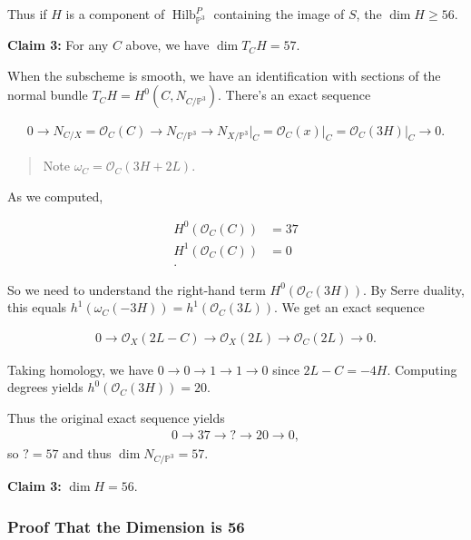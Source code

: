 Thus if \(H\) is a component of
\(\operatorname{Hilb}_{{\mathbb{P}}^3}^P\) containing the image of
\(S\), the \(\dim H \geq 56\).

\textbf{Claim 3:} For any \(C\) above, we have \(\dim T_C H = 57\).

When the subscheme is smooth, we have an identification with sections of
the normal bundle \(T_C H = H^0(C, N_{C/{\mathbb{P}}^3})\). There's an
exact sequence

\begin{align*} 0 \to N_{C/X} = {\mathcal{O}}_C(C) \to N_{C/{\mathbb{P}}^3} \to N_{X/{\mathbb{P}}^3}\mathrel{\Big|}_C = {\mathcal{O}}_C(x)\mathrel{\Big|}_C = {\mathcal{O}}_C(3H)\mathrel{\Big|}_C \to 0 .\end{align*}

\begin{quote}
Note \(\omega_C = {\mathcal{O}}_C(3H + 2L)\).
\end{quote}

As we computed,

\begin{align*} H^0({\mathcal{O}}_C(C)) &= 37 \\ H^1({\mathcal{O}}_C(C)) &= 0 \\ .\end{align*}

So we need to understand the right-hand term
\(H^0({\mathcal{O}}_C(3H))\). By Serre duality, this equals
\(h^1(\omega_C(-3H)) = h^1({\mathcal{O}}_C(3L))\). We get an exact
sequence

\begin{align*} 0 \to {\mathcal{O}}_X(2L-C) \to {\mathcal{O}}_X(2L) \to {\mathcal{O}}_C(2L) \to 0 .\end{align*}

Taking homology, we have \(0\to 0 \to 1 \to 1 \to 0\) since
\(2L-C = -4H\). Computing degrees yields
\(h^0 ({\mathcal{O}}_C(3H)) = 20\).

Thus the original exact sequence yields
\begin{align*}
0 \to 37 \to ? \to 20 \to 0
,\end{align*}
so \(? = 57\) and thus \(\dim N_{C/{\mathbb{P}}^3} = 57\).

\textbf{Claim 3:} \(\dim H = 56\).

\hypertarget{proof-that-the-dimension-is-56}{%
\subsubsection{Proof That the Dimension is
56}\label{proof-that-the-dimension-is-56}}

